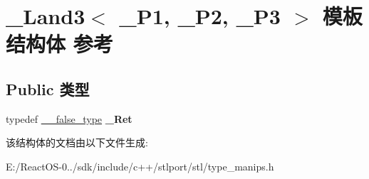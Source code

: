 \hypertarget{struct___land3}{}\section{\+\_\+\+Land3$<$ \+\_\+\+P1, \+\_\+\+P2, \+\_\+\+P3 $>$ 模板结构体 参考}
\label{struct___land3}
\subsection*{Public 类型}
\begin{DoxyCompactItemize}
\item 
\mbox{\label{struct___land3_ae833da0540af94465755a618d653838a}} 
typedef \hyperlink{struct____false__type}{\+\_\+\+\_\+false\+\_\+type} {\bfseries \+\_\+\+Ret}
\end{DoxyCompactItemize}


该结构体的文档由以下文件生成\+:\begin{DoxyCompactItemize}
\item 
E\+:/\+React\+O\+S-\/0../sdk/include/c++/stlport/stl/type\+\_\+manips.\+h\end{DoxyCompactItemize}
